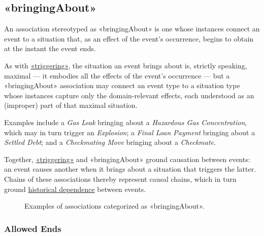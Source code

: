 



\subsection{«bringingAbout»}
\label{stereotype:bringingAbout}

An association stereotyped as «bringingAbout» is one whose instances connect an event to a situation that, as an effect of the event's occurrence, begins to obtain at the instant the event ends. 

As with \hyperref[stereotype:triggering]{«triggering»}, the situation an event brings about is, strictly speaking, maximal --- it embodies all the effects of the event's occurrence --- but a «bringingAbout» association may connect an event type to a situation type whose instances capture only the domain-relevant effects, each understood as an (improper) part of that maximal situation.

Examples include a \textit{Gas Leak} bringing about a \textit{Hazardous Gas Concentration}, which may in turn trigger an \textit{Explosion}; a \textit{Final Loan Payment} bringing about a \textit{Settled Debt}; and a \textit{Checkmating Move} bringing about a \textit{Checkmate}.

Together, \hyperref[stereotype:triggering]{«triggering»} and «bringingAbout» ground causation between events: an event causes another when it brings about a situation that triggers the latter. Chains of these associations thereby represent causal chains, which in turn ground \hyperref[stereotype:historicalDependence]{historical dependence} between events.

\begin{figure}[h]
    \centering
    
    \caption{Examples of associations categorized as «bringingAbout».}
    \label{fig:bringingAbout-example}
\end{figure}

\subsubsection{Allowed Ends}

